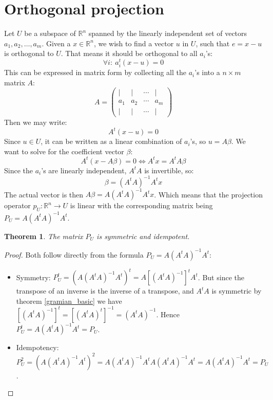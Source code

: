 \documentclass[12pt, a4paper]{article}
\newtheorem{theorem}{Theorem}[section]
\numberwithin{equation}{section}
\begin{document}
\section{Orthogonal projection}
Let $U$ be a subspace of $\mathbb{R}^n$ spanned by the linearly independent set of vectors $a_1, a_2,\ldots, a_m$. Given a $x\in\mathbb{R}^n$, we wish to find a vector $u$ in $U$, such that $e=x-u$ is orthogonal to $U$. That means it should be orthogonal to all $a_i$'s:
\begin{equation}
\forall i:\ a_i^t(x-u)=0
\end{equation}
This can be expressed in matrix form by collecting all the $a_i$'s into a $n\times m$ matrix $A$:
\begin{equation}
A=
\begin{pmatrix}
|	&	|	&	\cdots	&	|\\
a_1	&	a_2	&	\cdots	&	a_m\\
|	&	|	&	\cdots	&	|
\end{pmatrix}
\end{equation}
Then we may write:
\begin{equation}
A^t(x-u)=0
\end{equation}
Since $u\in U$, it can be written as a linear combination of $a_i$'s, so $u=A\beta$. We want to solve for the coefficient vector $\beta$:
\begin{equation}
A^t(x-A\beta)=0\Leftrightarrow A^t x=A^t A\beta
\end{equation}
Since the $a_i$'s are linearly independent, $A^t A$ is invertible, so: 
\begin{equation}
\beta=(A^t A)^{-1}A^t x
\end{equation}
The actual vector is then $A\beta=A(A^t A)^{-1}A^t x$. Which means that the projection operator $p_U:\mathbb{R}^n\rightarrow U$ is linear with the corresponding matrix being $P_U=A(A^t A)^{-1}A^t$.

\begin{theorem}
\label{projection_characterization}
The matrix $P_U$ is symmetric and idempotent.
\end{theorem}
\begin{proof}
Both follow directly from the formula $P_U=A(A^t A)^{-1}A^t$:
\begin{itemize}
\item Symmetry: $P_U^t=\left(A(A^t A)^{-1}A^t\right)^t=A\left[(A^t A)^{-1}\right]^t A^t$. But since the transpose of an inverse is the inverse of a transpose, and $A^t A$ is symmetric by theorem \ref{gramian_basic} we have $\left[(A^t A)^{-1}\right]^t=\left[(A^t A)^t\right]^{-1}=(A^t A)^{-1}$. Hence $P_U^t=A(A^t A)^{-1}A^t=P_U$.
\item Idempotency: $P_U^2=\left(A(A^t A)^{-1}A^t\right)^2=A(A^t A)^{-1}A^t A(A^t A)^{-1}A^t=A(A^t A)^{-1}A^t=P_U$.
\end{itemize}
\end{proof}
\end{document}
